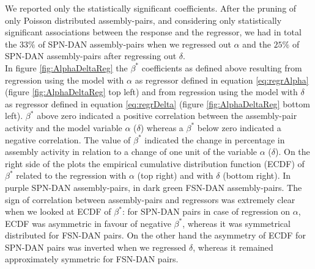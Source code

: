 We reported only the statistically significant coefficients. After the pruning of only Poisson distributed assembly-pairs, and considering only statistically significant associations between the response and the regressor, we had in total the $33\%$ of SPN-DAN assembly-pairs when we regressed out $\alpha$ and the $25\%$ of SPN-DAN assembly-pairs after regressing out $\delta$.\\In figure \ref{fig:AlphaDeltaReg} the $\beta^*$ coefficients as defined above resulting from regression using the model with $\alpha$ as regressor defined in equation \ref{eq:regrAlpha} (figure \ref{fig:AlphaDeltaReg} top left) and from regression using the model with $\delta$ as regressor defined in equation \ref{eq:regrDelta} (figure \ref{fig:AlphaDeltaReg} bottom left). $\beta^*$ above zero indicated a positive correlation between the assembly-pair activity and the model variable $\alpha$ ($\delta$) whereas a $\beta^*$ below zero indicated a negative correlation. The value of $\beta^*$ indicated the change in percentage in assembly activity in relation to a change of one unit of the variable $\alpha$ ($\delta$). On the right side of the plots the empirical cumulative distribution function (ECDF) of $\beta^*$ related to the regression with $\alpha$ (top right) and with $\delta$ (bottom right). In purple SPN-DAN assembly-pairs, in dark green FSN-DAN assembly-pairs. The sign of correlation between assembly-pairs and regressors was extremely clear when we looked at ECDF of $\beta^*$: for SPN-DAN pairs in case of regression on $\alpha$, ECDF was asymmetric in favour of negative $\beta^*$, whereas it was symmetrical distributed for FSN-DAN pairs. On the other hand the asymmetry of ECDF for SPN-DAN pairs was inverted when we regressed $\delta$, whereas it remained approximately symmetric for FSN-DAN pairs.
